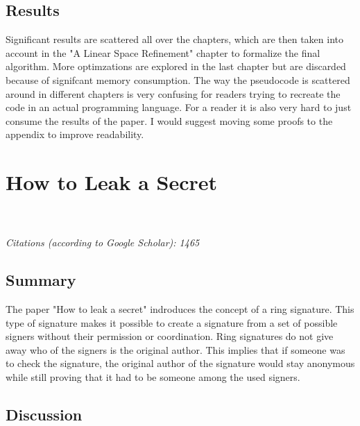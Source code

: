\documentclass{scrartcl}[11pt]
\begin{document}
\subsection{Results}
Significant results are scattered all over the chapters, which are then taken into account in the "A Linear Space Refinement" chapter to formalize the final algorithm. More optimzations are explored in the last chapter but are discarded because of signifcant memory consumption. The way the pseudocode is scattered around in different chapters is very confusing for readers trying to recreate the code in an actual programming language.
For a reader it is also very hard to just consume the results of the paper. I would suggest moving some proofs to the appendix to improve readability.




\pagebreak
\section{How to Leak a Secret}
\\\\
\emph{Citations (according to Google Scholar): 1465}
\subsection{Summary}
The paper "How to leak a secret" \cite{rivest2001leak} indroduces the concept of a ring signature. This type of signature makes it possible to create a signature from a set of possible signers without their permission or coordination. Ring signatures do not give away who of the signers is the original author.  This implies that if someone was to check the signature, the original author of the signature would stay anonymous while still proving that it had to be someone among the used signers. %

\subsection{Discussion}
\end{document}
